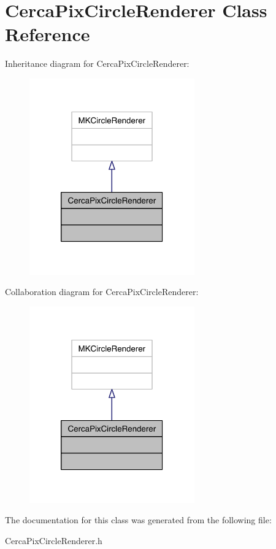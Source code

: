 \hypertarget{interface_cerca_pix_circle_renderer}{\section{Cerca\-Pix\-Circle\-Renderer Class Reference}
\label{interface_cerca_pix_circle_renderer}
}


Inheritance diagram for Cerca\-Pix\-Circle\-Renderer\-:\nopagebreak
\begin{figure}[H]
\begin{center}
\leavevmode
\includegraphics[width=202pt]{interface_cerca_pix_circle_renderer__inherit__graph}
\end{center}
\end{figure}


Collaboration diagram for Cerca\-Pix\-Circle\-Renderer\-:\nopagebreak
\begin{figure}[H]
\begin{center}
\leavevmode
\includegraphics[width=202pt]{interface_cerca_pix_circle_renderer__coll__graph}
\end{center}
\end{figure}


The documentation for this class was generated from the following file\-:\begin{DoxyCompactItemize}
\item 
Cerca\-Pix\-Circle\-Renderer.\-h\end{DoxyCompactItemize}
